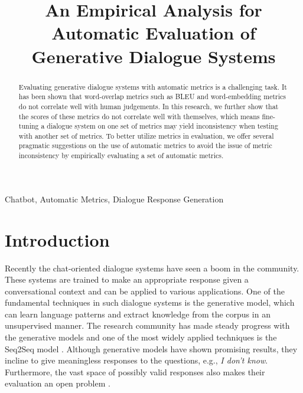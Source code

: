 \documentclass[conference]{IEEEtran}
\begin{document}
\title{An Empirical Analysis for Automatic Evaluation of Generative Dialogue Systems}

\author{
}

\maketitle

\begin{abstract}
Evaluating generative dialogue systems with automatic metrics is a challenging task.
It has been shown that word-overlap metrics such as BLEU and word-embedding metrics do not correlate well with human judgements.
In this research, we further show that the scores of these metrics do not correlate well with themselves, which means fine-tuning a dialogue system on one set of metrics may yield inconsistency when testing with another set of metrics.
To better utilize metrics in evaluation, we offer several pragmatic suggestions on the use of automatic metrics to avoid the issue of metric inconsistency by empirically evaluating a set of automatic metrics.
\end{abstract}

\begin{IEEEkeywords}
Chatbot, Automatic Metrics, Dialogue Response Generation
\end{IEEEkeywords}

\section{Introduction}
Recently the chat-oriented dialogue systems have seen a boom in the community.
These systems are trained to make an appropriate response given a conversational context and can be applied to various applications.
One of the fundamental techniques in such dialogue systems is the generative model, which can learn language patterns and extract knowledge from the corpus in an unsupervised manner.
The research community has made steady progress with the generative models and one of the most widely applied techniques is the Seq2Seq model \cite{Seq2Seq}.
Although generative models have shown promising results, they incline to give meaningless responses to the questions, e.g., \textit{I don't know}.
Furthermore, the vast space of possibly valid responses also makes their evaluation an open problem \cite{HowNot}.
\end{document}
